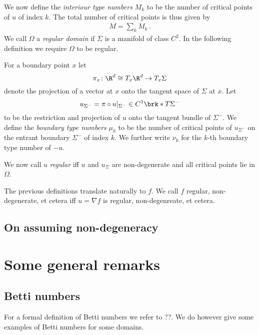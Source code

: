 We now define the \emph{interiour type numbers} $M_k$
to be the number of critical points of $u$ of index $k$.
The total number of critical points is thus given by
\begin{align*}
  M=\sum_kM_k\,.
\end{align*}
We call $\Omega$ a \emph{regular domain} if $\Sigma$ is a manifold of class $C^2$.
In the following definition we require $\Omega$ to be regular.
\begin{definition}
  For a boundary point $x$ let $$\pi_x\colon \R^d\cong T_x\R^d\to T_x\Sigma$$ denote the projection of a
  vector at $x$ onto the tangent space of $\Sigma$ at $x$.
  Let $$u_{\Sigma^-}=\pi\circ u\vert_{\Sigma^-}\in C^1\brk*{T\Sigma^-}$$ to be the restriction and projection of $u$ onto the tangent bundle of $\Sigma^-$.
  We define the \emph{boundary type numbers} $\mu_k$ to be
  the number of critical points of $u_{\Sigma^-}$ on the entrant boundary
  $\Sigma^-$ of index $k$.
  We further write $\nu_k$ for the $k$-th boundary type number of $-u$.
\end{definition}

We now call $u$ \emph{regular} iff $u$ and $u_\Sigma$ are non-degenerate and all critical points lie in $\Omega$.

The previous definitions translate naturally to $f$.
We call $f$ regular, non-degenerate, et cetera iff $u=\nabla f$ is regular, non-degenreate, et cetera.


\subsection{On assuming non-degeneracy}


\section{Some general remarks}


\subsection{Betti numbers}

For a formal definition of Betti numbers we refer to ??.
We do however give some examples of Betti numbers for some domains.

